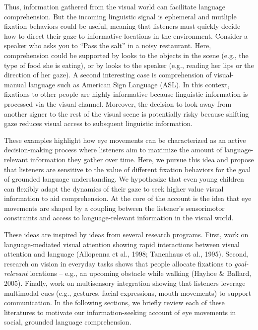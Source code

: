 \documentclass[english,floatsintext,man]{apa6}
\begin{document}
Thus, information gathered from the visual world can facilitate language
comprehension. But the incoming linguistic signal is ephemeral and
mutliple fixation behaviors could be useful, meaning that listeners must
quickly decide how to direct their gaze to informative locations in the
environment. Consider a speaker who asks you to \enquote{Pass the salt}
in a noisy restaurant. Here, comprehension could be supported by looks
to the objects in the scene (e.g., the type of food she is eating), or
by looks to the speaker (e.g., reading her lips or the direction of her
gaze). A second interesting case is comprehension of visual-manual
language such as American Sign Language (ASL). In this context,
fixations to other people are highly informative because linguistic
information is processed via the visual channel. Moreover, the decision
to look away from another signer to the rest of the visual scene is
potentially risky because shifting gaze reduces visual access to
subsquent linguistic information.

These examples highlight how eye movements can be characterized as an
active decision-making process where listeners aim to maximize the
amount of language-relevant information they gather over time. Here, we
pursue this idea and propose that listeners are sensitive to the value
of different fixation behaviors for the goal of grounded language
understanding. We hypothesize that even young children can flexibly
adapt the dynamics of their gaze to seek higher value visual information
to aid comprehension. At the core of the account is the idea that eye
movements are shaped by a coupling between the listener's sensorimotor
constraints and access to language-relevant information in the visual
world.

These ideas are inspired by ideas from several research programs. First,
work on language-mediated visual attention showing rapid interactions
between visual attention and language (Allopenna et al., 1998; Tanenhaus
et al., 1995). Second, research on vision in everyday tasks shows that
people allocate fixations to \emph{goal-relevant} locations -- e.g., an
upcoming obstacle while walking (Hayhoe \& Ballard, 2005). Finally, work
on multisensory integration showing that listeners leverage multimodal
cues (e.g., gestures, facial expressions, mouth movements) to support
communication. In the following sections, we briefly review each of
these literatures to motivate our information-seeking account of eye
movements in social, grounded language comprehension.
\end{document}
